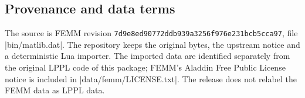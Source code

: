 \subsection{Provenance and data terms}
The source is FEMM revision
\nolinkurl{7d9e8ed90772ddb939a3256f976e231bcb5cca97},
file |bin/matlib.dat|. The repository keeps the original bytes, the
upstream notice and a deterministic Lua importer. The imported data are
identified separately from the original LPPL code of this package; FEMM's
Aladdin Free Public License notice is included in |data/femm/LICENSE.txt|.
The release does not relabel the FEMM data as LPPL data.
